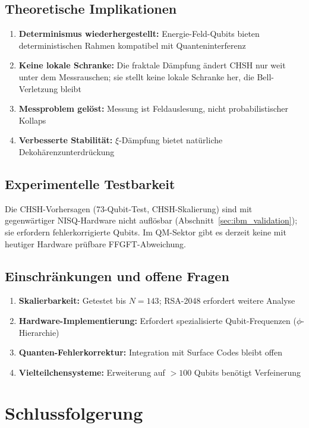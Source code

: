 \subsection{Theoretische Implikationen}

\begin{enumerate}
	\item \textbf{Determinismus wiederhergestellt:} Energie-Feld-Qubits bieten deterministischen Rahmen kompatibel mit Quanteninterferenz
	\item \textbf{Keine lokale Schranke:} Die fraktale Dämpfung ändert CHSH nur weit unter dem Messrauschen; sie stellt keine lokale Schranke her, die Bell-Verletzung bleibt
	\item \textbf{Messproblem gelöst:} Messung ist Feldauslesung, nicht probabilistischer Kollaps
	\item \textbf{Verbesserte Stabilität:} $\xi$-Dämpfung bietet natürliche Dekohärenzunterdrückung
\end{enumerate}

\subsection{Experimentelle Testbarkeit}

Die CHSH-Vorhersagen (73-Qubit-Test, CHSH-Skalierung) sind mit gegenwärtiger NISQ-Hardware nicht auflösbar (Abschnitt~\ref{sec:ibm_validation}); sie erfordern fehlerkorrigierte Qubits. Im QM-Sektor gibt es derzeit keine mit heutiger Hardware prüfbare FFGFT-Abweichung.

\subsection{Einschränkungen und offene Fragen}

\begin{enumerate}
	\item \textbf{Skalierbarkeit:} Getestet bis $N=143$; RSA-2048 erfordert weitere Analyse
	\item \textbf{Hardware-Implementierung:} Erfordert spezialisierte Qubit-Frequenzen ($\phi$-Hierarchie)
	\item \textbf{Quanten-Fehlerkorrektur:} Integration mit Surface Codes bleibt offen
	\item \textbf{Vielteilchensysteme:} Erweiterung auf $>100$ Qubits benötigt Verfeinerung
\end{enumerate}

\section{Schlussfolgerung}

